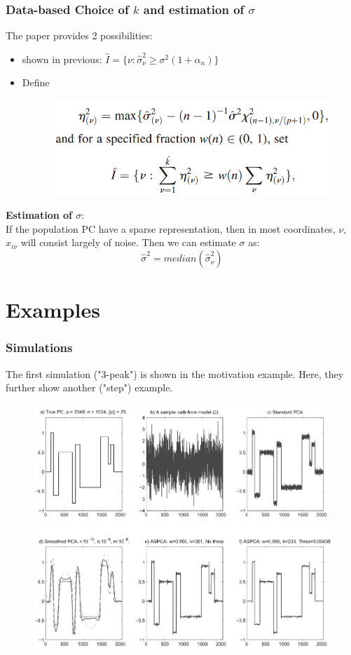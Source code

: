 \documentclass{beamer}
\begin{document}
	
	\begin{frame}
		\frametitle{Data-based Choice of $k$ and estimation of $\sigma$}
		The paper provides 2 possibilities:
		\begin{itemize}
			\item
			shown in previous:  $\hat{I} = \{{\nu: \hat\sigma}^2_{\nu} \geq \sigma^2(1+\alpha_n)\}$
			\item
			Define
			\begin{figure}
				\includegraphics[width=0.7\linewidth]{image009.png}
			\end{figure}
		\end{itemize}
		\textbf{Estimation of $\sigma$}:\\
		If the population PC have a sparse representation, then in most coordinates, $\nu$, $x_{i\nu}$ will consist largely of noise.
		Then we can estimate $\sigma$ as:
		$$\hat{\sigma}^2 = median(\hat{\sigma}^2_{\nu})$$
	\end{frame}
	
	\section{Examples}
	\begin{frame}
		\frametitle{Simulations}
		The first simulation ("3-peak") is shown in the motivation example. Here, they further show another ("step") example.
		\begin{figure}
			\includegraphics[width=0.7\linewidth]{image010.png}
		\end{figure}
		
	\end{frame}
\end{document}
